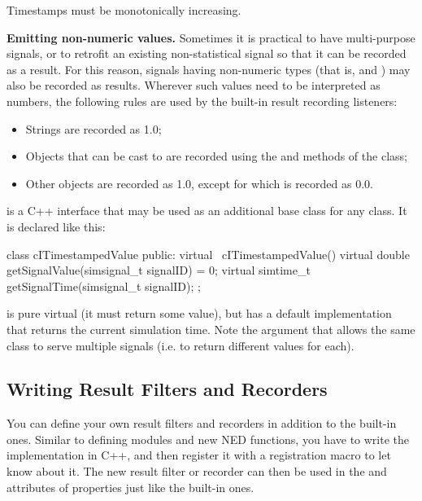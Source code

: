 Timestamps must be monotonically increasing.

\textbf{Emitting non-numeric values.} Sometimes it is practical to have
multi-purpose signals, or to retrofit an existing non-statistical signal so
that it can be recorded as a result. For this reason, signals having
non-numeric types (that is,  and ) may
also be recorded as results. Wherever such values need to be interpreted as
numbers, the following rules are used by the built-in result recording
listeners:

\begin{itemize}
  \item Strings are recorded as 1.0;
  \item Objects that can be cast to  are recorded
     using the  and 
     methods of the class;
  \item Other objects are recorded as 1.0, except for  which is recorded as 0.0.
\end{itemize}

 is a C++ interface that may be used as an additional
base class for any class. It is declared like this:

\begin{cpp}
class cITimestampedValue {
    public:
        virtual ~cITimestampedValue() {}
        virtual double getSignalValue(simsignal_t signalID) = 0;
        virtual simtime_t getSignalTime(simsignal_t signalID);
};
\end{cpp}

 is pure virtual (it must return some value),
but  has a default implementation that
returns the current simulation time. Note the  argument
that allows the same class to serve multiple signals (i.e. to return
different values for each).


\subsection{Writing Result Filters and Recorders}
\label{sec:simple-modules:writing-result-filters}

You can define your own result filters and recorders in addition to the
built-in ones. Similar to defining modules and new NED functions, you have
to write the implementation in C++, and then register it with a
registration macro to let {\opp} know about it. The new result filter or
recorder can then be used in the  and  attributes
of  properties just like the built-in ones.

